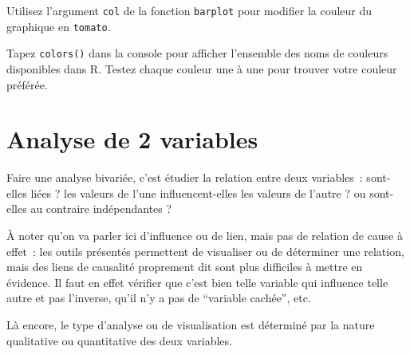 \documentclass[12pt,]{book}
\newenvironment{Shaded}{\begin{snugshade}}{\end{snugshade}}
\newcommand{\DataTypeTok}[1]{\textcolor[rgb]{0.27,0.27,0.27}{#1}}
\newcommand{\KeywordTok}[1]{\textcolor[rgb]{0.27,0.27,0.27}{\textbf{#1}}}
\newcommand{\NormalTok}[1]{#1}
\newcommand{\OperatorTok}[1]{\textcolor[rgb]{0.43,0.43,0.43}{\textbf{#1}}}
\newcommand{\StringTok}[1]{\textcolor[rgb]{0.5,0.5,0.5}{#1}}
\begin{document}
\begin{Shaded}
\end{Shaded}

\fi

Utilisez l'argument \texttt{col} de la fonction \texttt{barplot} pour modifier la couleur du graphique en
\texttt{tomato}.

Tapez \texttt{colors()} dans la console pour afficher l'ensemble des noms de couleurs disponibles dans R. Testez chaque couleur une à une pour trouver votre couleur préférée.

\hypertarget{analyse-de-2-variables}{%
\section{Analyse de 2 variables}\label{analyse-de-2-variables}}

Faire une analyse bivariée, c'est étudier la relation entre deux variables~: sont-elles liées ? les valeurs de l'une influencent-elles les valeurs de l'autre ? ou sont-elles au contraire indépendantes ?

À noter qu'on va parler ici d'influence ou de lien, mais pas de relation de cause à effet~: les outils présentés permettent de visualiser ou de déterminer une relation, mais des liens de causalité proprement dit sont plus difficiles à mettre en évidence. Il faut en effet vérifier que c'est bien telle variable qui influence telle autre et pas l'inverse, qu'il n'y a pas de ``variable cachée'', etc.

Là encore, le type d'analyse ou de visualisation est déterminé par la nature qualitative ou quantitative des deux variables.
\end{document}
